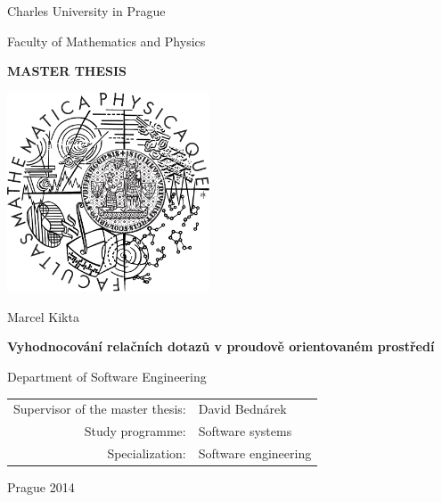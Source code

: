 \documentclass[12pt,a4paper]{report}
\begin{document}


\pagestyle{empty}
\begin{center}

\large

Charles University in Prague

\medskip

Faculty of Mathematics and Physics

\vfill

{\bf\Large MASTER THESIS}

\vfill

\centerline{\mbox{\includegraphics[width=60mm]{img/logo.pdf}}}

\vfill
\vspace{5mm}

{\LARGE Marcel Kikta}

\vspace{15mm}

{\LARGE\bfseries Vyhodnocování relačních dotazů v proudově orientovaném prostředí}

\vfill

Department of Software Engineering

\vfill

\begin{tabular}{rl}

Supervisor of the master thesis: & David Bednárek \\
\noalign{\vspace{2mm}}
Study programme: & Software systems \\
\noalign{\vspace{2mm}}
Specialization: & Software engineering \\
\end{tabular}

\vfill

Prague 2014

\end{center}
\end{document}
